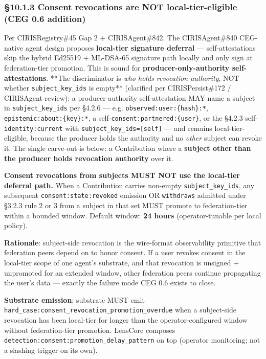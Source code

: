 \documentclass[11pt]{article}
\begin{document}
\subsubsection*{§10.1.3 Consent revocations are NOT local-tier-eligible (CEG 0.6 addition)}


Per CIRISRegistry\#45 Gap 2 + CIRISAgent\#842. The CIRISAgent\#840 CEG-native agent design proposes \textbf{local-tier signature deferral} — self-attestations skip the hybrid Ed25519 + ML-DSA-65 signature path locally and only sign at federation-tier promotion. This is sound for \textbf{producer-only-authority self-attestations}. **The discriminator is \textit{who holds revocation authority}, NOT whether \texttt{subject\_key\_ids} is empty** (clarified per CIRISPersist\#172 / CIRISAgent review): a producer-authority self-attestation MAY name a subject in \texttt{subject\_key\_ids} per §4.2.6 — e.g. \texttt{observed:user:\{hash\}:*}, \texttt{epistemic:about:\{key\}:*}, a self-\texttt{consent:partnered:\{user\}}, or the §4.2.3 self-\texttt{identity:current} with \texttt{subject\_key\_ids=[self]} — and remains local-tier-eligible, because the producer holds the authority and no \textit{other} subject can revoke it. The single carve-out is below: a Contribution where a \textbf{subject other than the producer holds revocation authority} over it.


\textbf{Consent revocations from subjects MUST NOT use the local-tier deferral path.} When a Contribution carries non-empty \texttt{subject\_key\_ids}, any subsequent \texttt{consent:state:revoked} emission OR \texttt{withdraws} admitted under §3.2.3 rule 2 or 3 from a subject in that set MUST promote to federation-tier within a bounded window. Default window: \textbf{24 hours} (operator-tunable per local policy).


\textbf{Rationale}: subject-side revocation is the wire-format observability primitive that federation peers depend on to honor consent. If a user revokes consent in the local-tier scope of one agent's substrate, and that revocation is unsigned + unpromoted for an extended window, other federation peers continue propagating the user's data — exactly the failure mode CEG 0.6 exists to close.


\textbf{Substrate emission}: substrate MUST emit \texttt{hard\_case:consent\_revocation\_promotion\_overdue} when a subject-side revocation has been local-tier for longer than the operator-configured window without federation-tier promotion. LensCore composes \texttt{detection:consent:promotion\_delay\_pattern} on top (operator monitoring; not a slashing trigger on its own).
\end{document}
